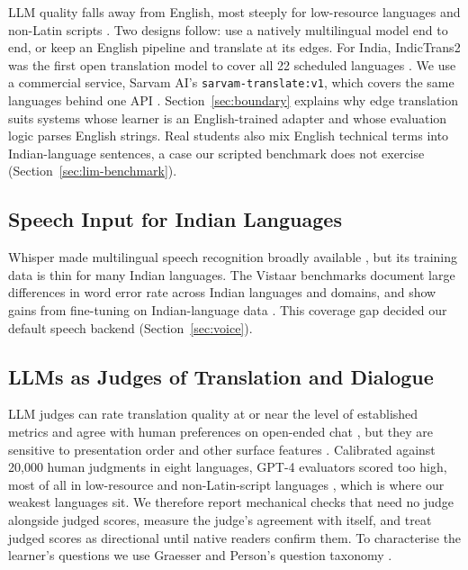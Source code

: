 \documentclass[pdflatex,sn-mathphys-num]{sn-jnl}%
\theoremstyle{thmstyleone}%
\theoremstyle{thmstyletwo}%
\theoremstyle{thmstylethree}%
\begin{document}
LLM quality falls away from English, most steeply for low-resource languages and non-Latin scripts
\cite{ahuja2023mega}. Two designs follow: use a natively multilingual model end to end, or keep an
English pipeline and translate at its edges. For India, IndicTrans2 was the first open translation
model to cover all 22 scheduled languages \cite{gala2023indictrans2}. We use a commercial service,
Sarvam AI's \texttt{sarvam-translate:v1}, which covers the same languages behind one API
\cite{sarvamtranslate}. Section~\ref{sec:boundary} explains why edge translation suits systems whose
learner is an English-trained adapter and whose evaluation logic parses English strings. Real
students also mix English technical terms into Indian-language sentences, a case our scripted
benchmark does not exercise (Section~\ref{sec:lim-benchmark}).

\subsection{Speech Input for Indian Languages}

Whisper made multilingual speech recognition broadly available \cite{radford2023whisper}, but its
training data is thin for many Indian languages. The Vistaar benchmarks document large differences
in word error rate across Indian languages and domains, and show gains from fine-tuning on
Indian-language data \cite{bhogale2023vistaar}. This coverage gap decided our default speech backend
(Section~\ref{sec:voice}).

\subsection{LLMs as Judges of Translation and Dialogue}

LLM judges can rate translation quality at or near the level of established metrics
\cite{kocmi2023gemba} and agree with human preferences on open-ended chat \cite{zheng2023judging}, but
they are sensitive to presentation order and other surface features \cite{wang2024fair}. Calibrated
against 20,000 human judgments in eight languages, GPT-4 evaluators scored too high, most of all in
low-resource and non-Latin-script languages \cite{hada2024multilingual}, which is where our weakest
languages sit. We therefore report mechanical checks that need no judge alongside judged scores,
measure the judge's agreement with itself, and treat judged scores as directional until native
readers confirm them. To characterise the learner's questions we use Graesser and Person's question
taxonomy \cite{graesser1994}.
\end{document}
